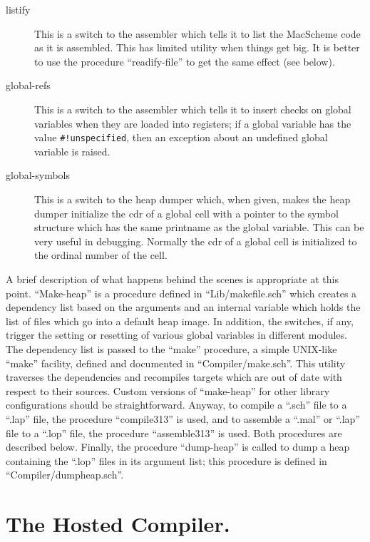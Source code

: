 \begin{description}
\item[listify] This is a switch to the assembler which tells it to list
the MacScheme code as it is assembled. This has limited utility when things
get big. It is better to use the procedure ``readify-file'' to get the same
effect (see below).

\item[global-refs] This is a switch to the assembler which tells it to
insert checks on global variables when they are loaded into registers; if
a global variable has the value \verb+#!unspecified+, then an exception
about an undefined global variable is raised.

\item[global-symbols] This is a switch to the heap dumper which, when given,
makes the heap dumper initialize the cdr of a global cell with a pointer
to the symbol structure which has the same printname as the global variable.
This can be very useful in debugging. Normally the cdr of a global cell is
initialized to the ordinal number of the cell.

\end{description}

A brief description of what happens behind the scenes is appropriate
at this point. ``Make-heap'' is a procedure defined in
``Lib/makefile.sch'' which creates a dependency list based on the
arguments and an internal variable which holds the list of files which
go into a default heap image. In addition, the switches, if any,
trigger the setting or resetting of various global variables in
different modules. The dependency list is passed to the ``make''
procedure, a simple UNIX-like ``make'' facility, defined and
documented in ``Compiler/make.sch''. This utility traverses the
dependencies and recompiles targets which are out of date with respect
to their sources.  Custom versions of ``make-heap'' for other library
configurations should be straightforward. Anyway, to compile a
``.sch'' file to a ``.lap'' file, the procedure ``compile313'' is
used, and to assemble a ``.mal'' or ``.lap'' file to a ``.lop'' file,
the procedure ``assemble313'' is used. Both procedures are described
below. Finally, the procedure ``dump-heap'' is called to dump a heap
containing the ``.lop'' files in its argument list; this procedure is
defined in ``Compiler/dumpheap.sch''.

\section{The Hosted Compiler.}

